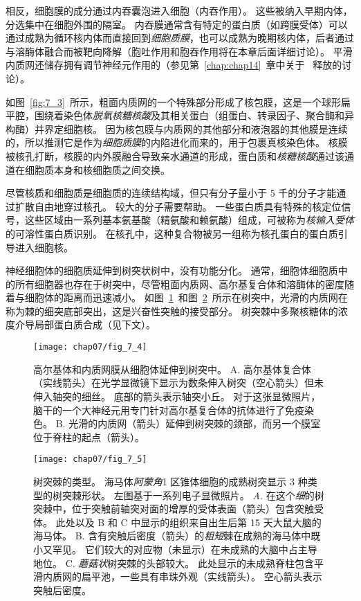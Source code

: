 相反，细胞膜的成分通过内吞囊泡进入细胞（内吞作用）。
这些被纳入早期内体，分选集中在细胞外围的隔室。
内吞膜通常含有特定的蛋白质（如跨膜受体）可以通过成熟为循环核内体而直接回到\textit{细胞质膜}，也可以成熟为晚期核内体，后者通过与溶酶体融合而被靶向降解（胞吐作用和胞吞作用将在本章后面详细讨论）。
平滑内质网还储存拥有调节神经元作用的（参见第~\ref{chap:chap14}~章中关于~ 释放的讨论）。


如图~\ref{fig:7_3}~所示，粗面内质网的一个特殊部分形成了核包膜，这是一个球形扁平腔，围绕着染色体\textit{脱氧核糖核酸}及其相关蛋白（组蛋白、转录因子、聚合酶和异构酶）并界定细胞核。
因为核包膜与内质网的其他部分和液泡器的其他膜是连续的，所以推测它是作为\textit{细胞质膜}的内陷进化而来的，用于包裹真核染色体。
核膜被核孔打断，核膜的内外膜融合导致亲水通道的形成，蛋白质和\textit{核糖核酸}通过该通道在细胞质本身和核细胞质之间交换。


尽管核质和细胞质是细胞质的连续结构域，但只有分子量小于 5 千的分子才能通过扩散自由地穿过核孔。
较大的分子需要帮助。
一些蛋白质具有特殊的核定位信号，这些区域由一系列基本氨基酸（精氨酸和赖氨酸）组成，可被称为\textit{核输入受体}的可溶性蛋白质识别。
在核孔中，这种复合物被另一组称为核孔蛋白的蛋白质引导进入细胞核。


神经细胞体的细胞质延伸到树突状树中，没有功能分化。 
通常，细胞体细胞质中的所有细胞器也存在于树突中，尽管粗面内质网、高尔基复合体和溶酶体的密度随着与细胞体的距离而迅速减小。 
如图~\ref{fig:7_4}~和图~\ref{fig:7_5}~所示在树突中，光滑的内质网在称为棘的细突底部突出，这是兴奋性突触的接受部分。
树突棘中多聚核糖体的浓度介导局部蛋白质合成（见下文）。


\begin{figure}[htbp]
	\centering
	\texttt{[image: chap07/fig\_7\_4]}
	\caption{高尔基体和内质网膜从细胞体延伸到树突中。
		A. 高尔基体复合体（实线箭头）在光学显微镜下显示为数条伸入树突（空心箭头）但未伸入轴突的细丝。
		底部的箭头表示轴突小丘。
		对于这张显微照片，脑干的一个大神经元用专门针对高尔基复合体的抗体进行了免疫染色\cite{de1986heterogeneous}。
		B. 光滑的内质网（箭头）延伸到树突棘的颈部，而另一个膜室位于脊柱的起点（箭头）\cite{cooney2002endosomal}。}
	\label{fig:7_4}
\end{figure}


\begin{figure}[htbp]
	\centering
	\texttt{[image: chap07/fig\_7\_5]}
	\caption{树突棘的类型。
		海马体\textit{阿蒙角}1 区锥体细胞的成熟树突显示 3 种类型的树突棘形状。
		左图基于一系列电子显微照片\cite{harris1989dendritic,sorra1993occurrence}。
		\textit{A.} 在这个\textit{细}的树突棘中，位于突触前轴突对面的增厚的受体表面（箭头）包含突触受体。
		此处以及 B 和 C 中显示的组织来自出生后第 15 天大鼠大脑的海马体。
		B. 含有突触后密度（箭头）的\textit{粗短}棘在成熟的海马体中既小又罕见。
		它们较大的对应物（未显示）在未成熟的大脑中占主导地位。
		C. \textit{蘑菇状}树突棘的头部较大。
		此处显示的未成熟脊柱包含平滑内质网的扁平池，一些具有串珠外观（实线箭头）。
		空心箭头表示突触后密度。}
	\label{fig:7_5}
\end{figure}


